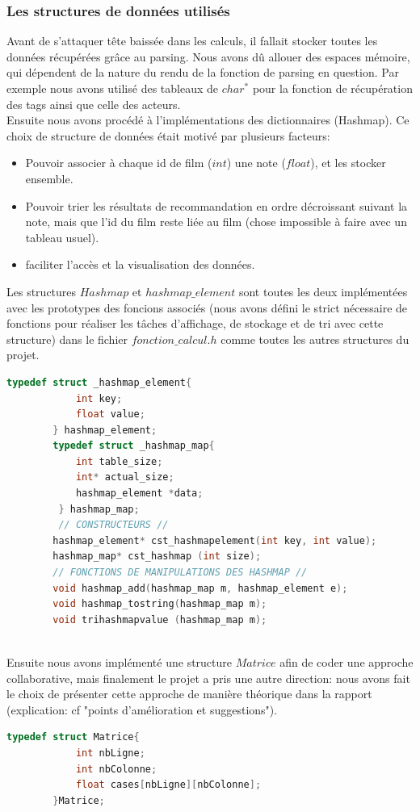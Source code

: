 \documentclass[light]{ceri}
\begin{document}
\subsubsection{Les structures de données utilisés}
    Avant de s'attaquer tête baissée dans les calculs, il fallait stocker toutes les données récupérées grâce au parsing. Nous avons dû allouer des espaces mémoire, qui dépendent de la nature du rendu de la fonction de parsing en question. Par exemple nous avons utilisé des tableaux de $char^*$ pour la fonction de récupération des tags ainsi que celle des acteurs.\\
    \indent Ensuite nous avons procédé à l'implémentations des dictionnaires (Hashmap). Ce choix de structure de données était motivé par plusieurs facteurs:
    \begin{itemize}
        \item Pouvoir associer à chaque id de film ($int$)
        une note ($float$), et les stocker ensemble.
        \item Pouvoir trier les résultats de recommandation en ordre décroissant suivant la note, mais que l'id du film reste liée au film (chose impossible à faire avec un tableau usuel).
        \item faciliter l'accès et la visualisation des données.
    \end{itemize}
    Les structures $Hashmap$ et $hashmap\_element$ sont toutes les deux implémentées avec les prototypes des foncions associés (nous avons défini le strict nécessaire de fonctions pour réaliser les tâches d'affichage, de stockage et  de tri avec cette structure) dans le fichier $fonction\_calcul.h$ comme toutes les autres structures du projet.
    \begin{lstlisting}[language=c]
        typedef struct _hashmap_element{
        	int key;
        	float value;
        } hashmap_element;
        typedef struct _hashmap_map{
        	int table_size;
        	int* actual_size;
        	hashmap_element *data;
         } hashmap_map;
         // CONSTRUCTEURS //
        hashmap_element* cst_hashmapelement(int key, int value);
        hashmap_map* cst_hashmap (int size);
        // FONCTIONS DE MANIPULATIONS DES HASHMAP //
        void hashmap_add(hashmap_map m, hashmap_element e);
        void hashmap_tostring(hashmap_map m);
        void trihashmapvalue (hashmap_map m);
    \end{lstlisting}
    \\
    \indent Ensuite nous avons implémenté une structure $Matrice$ afin de coder une approche collaborative, mais finalement le projet a pris une autre direction: nous avons fait le choix de présenter cette approche de manière théorique dans la rapport (explication: cf "points d'amélioration et suggestions").\\
    \begin{lstlisting}[language=c]
        typedef struct Matrice{
            int nbLigne;
            int nbColonne;
            float cases[nbLigne][nbColonne];
        }Matrice; 
    \end{lstlisting}
\end{document}
